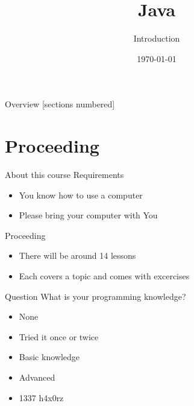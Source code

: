 


\title{Java}
\subtitle{Introduction}
\date{\today}






\begin{frame}
	\titlepage
\end{frame}
\begin{frame}{Overview}
	[sections numbered]
	\tableofcontents
\end{frame}

\section{Proceeding}
\begin{frame}{About this course}
	Requirements
	\begin{itemize}
		\item You know how to use a computer
        \item Please bring your computer with You
	\end{itemize}
	Proceeding
	\begin{itemize}
		\item There will be around 14 lessons
		\item Each covers a topic and comes with excercises
	\end{itemize}
\end{frame}

\begin{frame}{Question}
	What is your programming knowledge?
	\begin{itemize}
		\item None
		\item Tried it once or twice
		\item Basic knowledge
		\item Advanced
		\item 1337 h4x0rz
	\end{itemize}
\end{frame}

